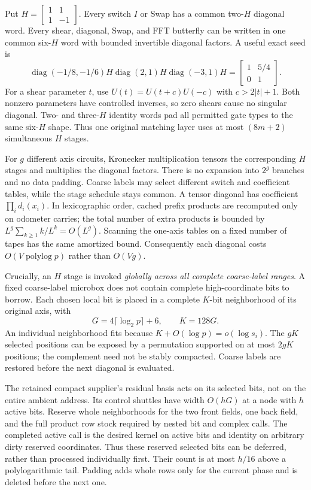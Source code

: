 \documentclass[11pt]{article}
\newcommand{\diag}{\operatorname{diag}}
\newcommand{\plog}{\operatorname{polylog}}
\begin{document}
Put $H=\left[\begin{smallmatrix}1&1\\1&-1\end{smallmatrix}\right]$. Every switch $I$ or Swap has a common two-$H$ diagonal word. Every shear, diagonal, Swap, and FFT butterfly can be written in one common six-$H$ word with bounded invertible diagonal factors. A useful exact seed is
\[
 \diag(-1/8,-1/6)H\diag(2,1)H\diag(-3,1)H
 =\begin{bmatrix}1&5/4\\0&1\end{bmatrix}.
\]
For a shear parameter $t$, use $U(t)=U(t+c)U(-c)$ with $c>2|t|+1$. Both nonzero parameters have controlled inverses, so zero shears cause no singular diagonal. Two- and three-$H$ identity words pad all permitted gate types to the same six-$H$ shape. Thus one original matching layer uses at most $(8m+2)$ simultaneous $H$ stages.

For $g$ different axis circuits, Kronecker multiplication tensors the corresponding $H$ stages and multiplies the diagonal factors. There is no expansion into $2^g$ branches and no data padding. Coarse labels may select different switch and coefficient tables, while the stage schedule stays common. A tensor diagonal has coefficient $\prod_i d_i(x_i)$. In lexicographic order, cached prefix products are recomputed only on odometer carries; the total number of extra products is bounded by $L^g\sum_{k\geq1}k/L^k=O(L^g)$. Scanning the one-axis tables on a fixed number of tapes has the same amortized bound. Consequently each diagonal costs $O(V\plog p)$ rather than $O(Vg)$.

Crucially, an $H$ stage is invoked \emph{globally across all complete coarse-label ranges}. A fixed coarse-label microbox does not contain complete high-coordinate bits to borrow. Each chosen local bit is placed in a complete $K$-bit neighborhood of its original axis, with
\[
 G=4\lceil\log_2p\rceil+6,\qquad K=128G.
\]
An individual neighborhood fits because $K+O(\log p)=o(\log s_i)$. The $gK$ selected positions can be exposed by a permutation supported on at most $2gK$ positions; the complement need not be stably compacted. Coarse labels are restored before the next diagonal is evaluated.

The retained compact supplier's residual basis acts on its selected bits, not on the entire ambient address. Its control shuttles have width $O(hG)$ at a node with $h$ active bits. Reserve whole neighborhoods for the two front fields, one back field, and the full product row stock required by nested bit and complex calls. The completed active call is the desired kernel on active bits and identity on arbitrary dirty reserved coordinates. Thus these reserved selected bits can be deferred, rather than processed individually first. Their count is at most $h/16$ above a polylogarithmic tail. Padding adds whole rows only for the current phase and is deleted before the next one.
\end{document}
